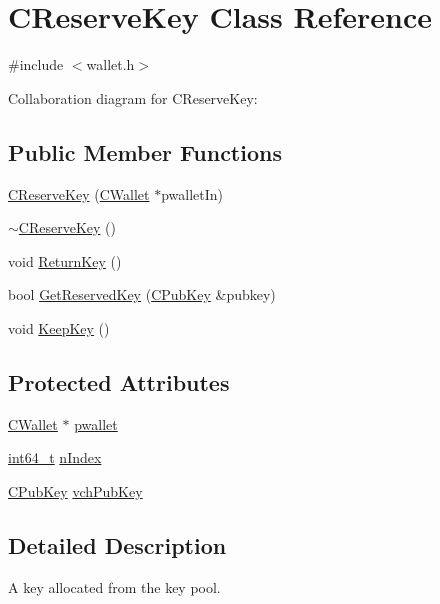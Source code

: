\hypertarget{class_c_reserve_key}{}\section{C\+Reserve\+Key Class Reference}
\label{class_c_reserve_key}


{\ttfamily \#include $<$wallet.\+h$>$}



Collaboration diagram for C\+Reserve\+Key\+:
\subsection*{Public Member Functions}
\begin{DoxyCompactItemize}
\item 
\hyperlink{class_c_reserve_key_ab5c15654a1e28bf5f2852512381d07c4}{C\+Reserve\+Key} (\hyperlink{class_c_wallet}{C\+Wallet} $\ast$pwallet\+In)
\item 
\hyperlink{class_c_reserve_key_a71dc4f86968df51ffa263371fdb93f3f}{$\sim$\+C\+Reserve\+Key} ()
\item 
void \hyperlink{class_c_reserve_key_af7b0a61f8c70c8146e42e82b4e227204}{Return\+Key} ()
\item 
bool \hyperlink{class_c_reserve_key_ad198d2d7a54d315c60805ba1cb0caf7c}{Get\+Reserved\+Key} (\hyperlink{class_c_pub_key}{C\+Pub\+Key} \&pubkey)
\item 
void \hyperlink{class_c_reserve_key_a493d06f41ca9571f2a42c8581a3952d8}{Keep\+Key} ()
\end{DoxyCompactItemize}
\subsection*{Protected Attributes}
\begin{DoxyCompactItemize}
\item 
\hyperlink{class_c_wallet}{C\+Wallet} $\ast$ \hyperlink{class_c_reserve_key_aab8a4052c0b9a4337248ae53e77c6115}{pwallet}
\item 
\hyperlink{stdint_8h_adec1df1b8b51cb32b77e5b86fff46471}{int64\+\_\+t} \hyperlink{class_c_reserve_key_a16d05c9be039eb772f2daf412cca1991}{n\+Index}
\item 
\hyperlink{class_c_pub_key}{C\+Pub\+Key} \hyperlink{class_c_reserve_key_a2b252444577b6aca8b497c2207ff17a4}{vch\+Pub\+Key}
\end{DoxyCompactItemize}


\subsection{Detailed Description}
A key allocated from the key pool. 

